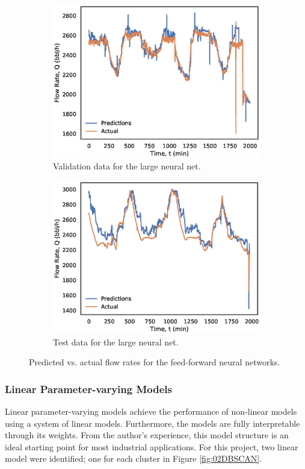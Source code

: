 \begin{figure}[p]
\begin{subfigure}[b]{0.48\textwidth}
         \includegraphics[width=\textwidth]{images/suncor/08largenn_valid.eps}
         \caption{Validation data for the large neural net.}
         \label{fig:02largenn_valid}
     \end{subfigure}
     \begin{subfigure}[b]{0.48\textwidth}
         \includegraphics[width=\textwidth]{images/suncor/08largenn_test.eps}
         \caption{Test data for the large neural net.}
         \label{fig:02largenn_test}
     \end{subfigure}
        \caption{Predicted vs. actual flow rates for the feed-forward neural networks.}
        \label{fig:02NNPlots}
\end{figure}


\subsubsection{Linear Parameter-varying Models}
Linear parameter-varying models achieve the performance of non-linear models using a system of linear models.  Furthermore, the models are fully interpretable through its weights.  From the author's experience, this model structure is an ideal starting point for most industrial applications.  For this project, two linear model were identified; one for each cluster in Figure \ref{fig:02DBSCAN}.


